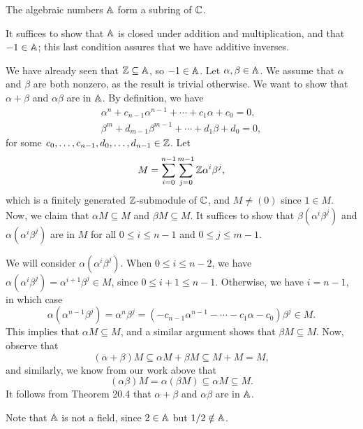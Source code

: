 \begin{theo}{}
    The algebraic numbers $\mathbb{A}$ form a subring of $\mathbb{C}$. 
\end{theo}
\begin{pf}
    It suffices to show that $\mathbb{A}$ is closed under addition and multiplication, 
    and that $-1 \in \mathbb{A}$; this last condition assures that we have additive inverses. 

    We have already seen that $\mathbb{Z} \subseteq \mathbb{A}$, so $-1 \in \mathbb{A}$. Let 
    $\alpha, \beta \in \mathbb{A}$. We assume that $\alpha$ and $\beta$ are both 
    nonzero, as the result is trivial otherwise. We want to show that 
    $\alpha + \beta$ and $\alpha\beta$ are in $\mathbb{A}$. By definition, we have 
    \begin{align*}
        \alpha^n + c_{n-1} \alpha^{n-1} + \cdots + c_1 \alpha + c_0 = 0, \\ 
        \beta^m + d_{m-1} \beta^{m-1} + \cdots + d_1 \beta + d_0 = 0,
    \end{align*}
    for some $c_0, \dots, c_{n-1}, d_0, \dots, d_{n-1} \in \mathbb{Z}$. Let 
    \[ M = \sum_{i=0}^{n-1} \sum_{j=0}^{m-1} \mathbb{Z}\alpha^i\beta^j, \] 
    which is a finitely generated $\mathbb{Z}$-submodule of $\mathbb{C}$, and $M \neq (0)$ since 
    $1 \in M$. Now, we claim that $\alpha M \subseteq M$ and $\beta M \subseteq M$. 
    It suffices to show that $\beta (\alpha^i \beta^j)$ and $\alpha (\alpha^i 
    \beta^j)$ are in $M$ for all $0 \leq i \leq n-1$ and $0 \leq j \leq m-1$. 

    We will consider $\alpha(\alpha^i \beta^j)$. When $0 \leq i \leq n-2$, we have 
    $\alpha (\alpha^i \beta^j) = \alpha^{i+1} \beta^j \in M$, since 
    $0 \leq i+1 \leq n-1$. Otherwise, we have $i = n-1$, in which case 
    \[ \alpha(\alpha^{n-1}\beta^j) = \alpha^n \beta^j = 
    (-c_{n-1} \alpha^{n-1} - \cdots - c_1 \alpha- c_0) \beta^j
    \in M. \] 
    This implies that $\alpha M \subseteq M$, and a similar argument shows that 
    $\beta M \subseteq M$. Now, observe that 
    \[ (\alpha + \beta)M \subseteq \alpha M + \beta M \subseteq M + M = M, \] 
    and similarly, we know from our work above that 
    \[ (\alpha \beta) M = \alpha(\beta M) \subseteq \alpha M \subseteq M. \] 
    It follows from Theorem 20.4 that $\alpha + \beta$ and $\alpha\beta$ are in $\mathbb{A}$.
\end{pf}

\begin{remark}{}
    Note that $\mathbb{A}$ is not a field, since $2 \in \mathbb{A}$ but $1/2 \notin \mathbb{A}$. 
\end{remark}


